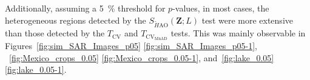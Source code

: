 Additionally, assuming a \SI{5}{\percent} threshold for \(p\)-values, in
most cases, the heterogeneous regions detected by the
\(S_{\widetilde{H}{\text{AO}}}(\bm{Z}; L)\) test were more extensive
than those detected by the \(T_\text{CV}\) and
\(T_{\text{CV}_{\text{MnAD}}}\) tests. 
This was mainly observable in
Figures~\ref{fig:sim_SAR_Images_p05} \ref{fig:sim_SAR_Images_p05-1},
~\ref{fig:Mexico_crops_0.05} \ref{fig:Mexico_crops_0.05-1}, and~\ref{fig:lake_0.05} \ref{fig:lake_0.05-1}.
